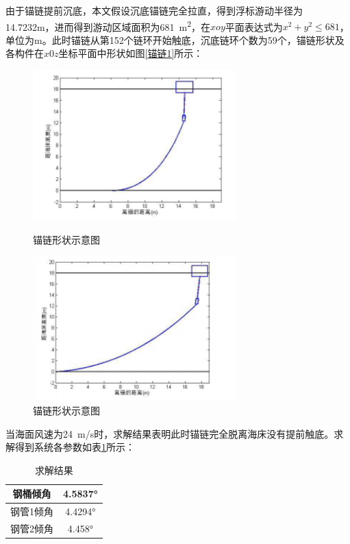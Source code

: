 \documentclass{article}
\numberwithin{equation}{subsection}
\begin{document}
由于锚链提前沉底，本文假设沉底锚链完全拉直，得到浮标游动半径为14.7232m，进而得到游动区域面积为\SI{681}{m^{2}}，在$xoy$平面表达式为$x^{2}+y^{2}\le681$，单位为m。此时锚链从第152个链环开始触底，沉底链环个数为59个，锚链形状及各构件在$x0z$坐标平面中形状如图\ref{锚链1}所示：
\begin{figure}[H]
    \begin{minipage}[c]{0.5\textwidth}
        \centering
        \includegraphics[width=0.7\textwidth]{锚链1.png}
        \caption{\kaishu 锚链形状示意图}
        \label{锚链1}
    \end{minipage}
    \begin{minipage}[c]{0.5\textwidth}
        \centering
        \includegraphics[width=0.7\textwidth]{锚链2.png}
        \caption{\kaishu 锚链形状示意图}
        \label{锚链2}
    \end{minipage}
\end{figure}

当海面风速为\SI{24}{m/s}时，求解结果表明此时锚链完全脱离海床没有提前触底。求解得到系统各参数如表\ref{求解结果2}所示：
\begin{table}[!htbp]
\centering
    \begin{tabular}{c|c}
\hline
钢桶倾角&4.5837°\\
\hline
钢管1倾角&4.4294°\\
\hline
钢管2倾角&4.458°\\
\hline
    \end{tabular}
    \caption{求解结果}
    \label{求解结果2}
\end{table}
\end{document}
